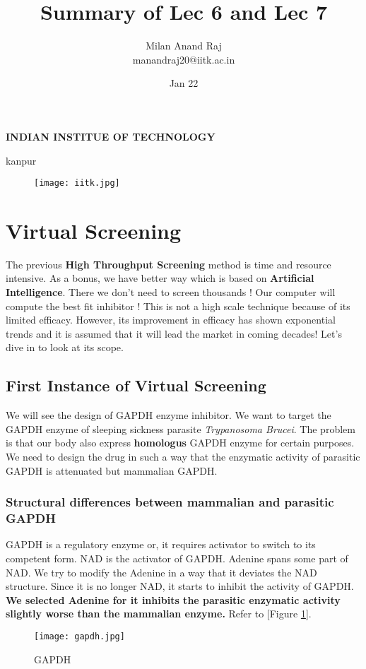 \documentclass[12pt]{article}
\title{Summary of Lec 6 and Lec 7}
\author{Milan Anand Raj\\manandraj20@iitk.ac.in}
\date{Jan 22}
\begin{document}
\NoBgThispage
\maketitle



\begin{center}
\textbf{INDIAN INSTITUE OF TECHNOLOGY}

kanpur
\end{center}


\vfill
\begin{figure}
\centering
\texttt{[image: iitk.jpg]}
\end{figure}
\clearpage
\tableofcontents
\clearpage
\NoBgThispage
\section{Virtual Screening}
The previous \textbf{High Throughput Screening} method is time and resource intensive. As a bonus, we have better way which is based on \textbf{Artificial Intelligence}. There we don't need to screen thousands ! Our computer will compute the best fit inhibitor ! This is not a high scale technique because of its limited efficacy. However, its improvement in efficacy has shown exponential trends and it is assumed that it will lead the market in coming decades!
Let's dive in to look at its scope.



\subsection{First Instance of Virtual Screening }
We will see the design of GAPDH enzyme inhibitor. We want to target the GAPDH enzyme of sleeping sickness parasite \textit{Trypanosoma Brucei}. The problem is that our body also express \textbf{homologus} GAPDH enzyme for certain purposes. We need to design the drug in such a way that the enzymatic activity of parasitic GAPDH is attenuated but mammalian GAPDH.
\vfill
\subsubsection{Structural differences between mammalian and parasitic GAPDH}
GAPDH is a regulatory enzyme or, it requires activator to switch to its competent form. NAD is the activator of GAPDH. Adenine spans some part of NAD. We try to modify the Adenine in a way that it deviates the NAD structure. Since it is no longer NAD, it starts to inhibit the activity of GAPDH. \textbf{We selected Adenine for it inhibits the parasitic enzymatic activity slightly worse than the mammalian enzyme.} 
Refer to [Figure \ref{fig gapdh}].
\begin{figure}[h]
\centering
\texttt{[image: gapdh.jpg]}
\label{fig gapdh}
\caption{GAPDH}
\end{figure}
\clearpage
\vfill
\end{document}
